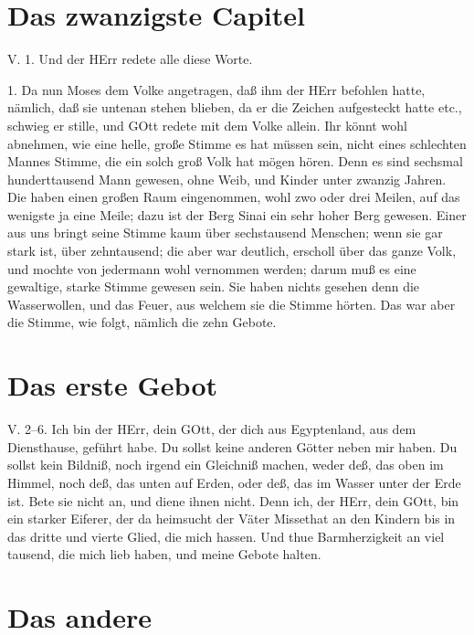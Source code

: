 \section{Das zwanzigste Capitel}

\begin{schriftzitat}
V. 1. Und der HErr redete alle diese Worte.
\end{schriftzitat}

1. Da nun Moses dem Volke angetragen, daß ihm der HErr befohlen hatte, nämlich, daß sie untenan stehen blieben, da er die Zeichen aufgesteckt hatte etc., schwieg er stille, und GOtt redete mit dem Volke allein. Ihr könnt wohl abnehmen, wie eine helle, große Stimme es hat müssen sein, nicht eines schlechten Mannes Stimme, die ein solch groß Volk hat mögen hören. Denn es sind sechsmal hunderttausend Mann gewesen, ohne Weib, und Kinder unter zwanzig Jahren. Die haben einen großen Raum eingenommen, wohl zwo oder drei Meilen, auf das wenigste ja eine Meile; dazu ist der Berg Sinai ein sehr hoher Berg gewesen. Einer aus uns bringt seine Stimme kaum über sechstausend Menschen; wenn sie gar stark ist, über zehntausend; die aber war deutlich, erscholl über das ganze Volk,
und mochte von jedermann wohl vernommen werden; darum muß es eine gewaltige, starke Stimme gewesen sein. Sie haben nichts gesehen denn die Wasserwollen, und das Feuer, aus welchem sie die Stimme hörten. Das war aber die Stimme, wie folgt, nämlich die zehn Gebote.

\section{Das erste Gebot}

\begin{schriftzitat}
V. 2–6. Ich bin der HErr, dein GOtt, der dich aus Egyptenland, aus dem Diensthause, geführt habe. Du sollst keine anderen Götter neben mir haben. Du sollst kein Bildniß, noch irgend ein Gleichniß machen, weder deß, das oben im Himmel, noch deß, das unten auf Erden, oder deß, das im Wasser unter der Erde ist. Bete sie nicht an, und diene ihnen nicht. Denn ich, der HErr, dein GOtt, bin ein starker Eiferer, der da heimsucht der Väter Missethat an den Kindern bis in das dritte und vierte Glied, die mich hassen. Und thue Barmherzigkeit an viel tausend, die mich lieb haben, und meine Gebote halten.
\end{schriftzitat}

\section{Das andere}

